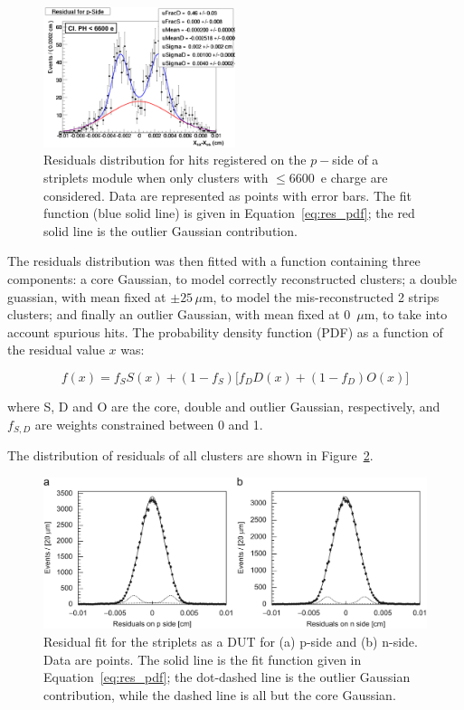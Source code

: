 \begin{figure}
\centering
\includegraphics[width=0.5\textwidth]{annotated_res_pside_1stPHbin.pdf}
\caption{\label{fig:annotated_res_pside_1stPHbin}Residuals distribution for hits registered on the $p-$side of a 
striplets module when only clusters with $\le$6600~e charge are considered. Data are represented as points with error bars. The fit function (blue solid line) is given in Equation~\ref{eq:res_pdf}; the red solid line 
is the outlier Gaussian contribution.}
\end{figure}

The residuals distribution was then fitted with a function containing three components: a core 
Gaussian, to model correctly reconstructed clusters; a double guassian, with mean fixed at 
$\pm 25\, \mu$m, to model the mis-reconstructed 2 strips clusters; and finally an outlier Gaussian, 
with mean fixed at 0~$\mu$m, to take into account spurious hits. 
The probability density function (PDF) as a function of the residual value $x$ was:

\begin{equation}
f(x)=f_S S(x)+(1-f_S)\Big[  f_DD(x)+(1-f_D)O(x) \Big]
\label{eq:res_pdf}
\end{equation}

where S, D and O are the core, double and outlier Gaussian, respectively, and $f_{S,D}$ are 
weights constrained between 0 and 1. 

The distribution of residuals of all clusters are shown in Figure~\ref{fig:striplets_residuals}. 

\begin{figure}
\centering
\includegraphics[width=1.0\textwidth]{striplets_residuals.jpg}
\caption{\label{fig:striplets_residuals}Residual fit for the striplets as a DUT for (a) p-side and (b) n-side. Data are points.  The solid  line 
is the   fit function  given in Equation~\ref{eq:res_pdf}; the dot-dashed line is the outlier Gaussian 
contribution, while the dashed line is all but the core Gaussian.}
\end{figure}

